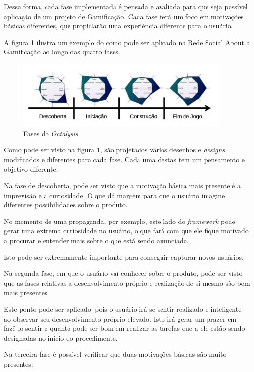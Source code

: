 Dessa forma, cada fase implementada é pensada e avaliada para que seja possível
aplicação de um  projeto de Gamificação. Cada fase terá um foco em motivações
básicas diferentes, que propiciarão uma experiência diferente para o usuário.

A figura \ref{fig:fasesoctalysis} ilustra um exemplo do como pode ser aplicado na
Rede Social About a Gamificação ao longo das quatro fases.

\begin{figure}[h]
    \centering
    \includegraphics[width=400px, scale=1]{figuras/fasesoctalysis}
    \caption{Fases do \textit{Octalysis}}
    \label{fig:fasesoctalysis}
\end{figure}

Como pode ser visto na figura \ref{fig:fasesoctalysis}, são projetados vários
desenhos e \textit{designs} modificados e diferentes para cada fase. Cada uma destas
tem um pensamento e objetivo diferente.

Na fase de descoberta, pode ser visto que a motivação básica mais presente é
a imprevisão e a curiosidade. O que dá margem para que o usuário imagine diferentes
possibilidades sobre o produto.

No momento de uma propaganda, por exemplo, este lado do \textit{framework} pode gerar uma
extrema curiosidade no usuário, o que fará com que ele fique motivado a procurar
e entender mais sobre o que está sendo anunciado.

Isto pode ser extremamente importante para conseguir capturar novos usuários.

Na segunda fase, em que o usuário vai conhecer sobre o produto, pode ser visto
que as fases relativas a desenvolvimento próprio e realização de si mesmo
são bem mais presentes.

Este ponto pode ser aplicado, pois o usuário irá se sentir realizado e inteligente
ao observar seu desenvolvimento próprio elevado. Isto irá gerar um prazer em fazê-lo
sentir o quanto pode ser bom em realizar as tarefas que a ele estão sendo designadas
no início do procedimento.

Na terceira fase é possível verificar que duas motivações básicas são muito presentes:

